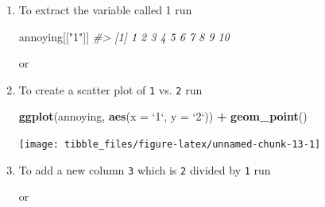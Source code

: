 \documentclass[]{book}
\newenvironment{Shaded}{\begin{snugshade}}{\end{snugshade}}
\newcommand{\CommentTok}[1]{\textcolor[rgb]{0.56,0.35,0.01}{\textit{#1}}}
\newcommand{\DataTypeTok}[1]{\textcolor[rgb]{0.13,0.29,0.53}{#1}}
\newcommand{\KeywordTok}[1]{\textcolor[rgb]{0.13,0.29,0.53}{\textbf{#1}}}
\newcommand{\NormalTok}[1]{#1}
\newcommand{\OperatorTok}[1]{\textcolor[rgb]{0.81,0.36,0.00}{\textbf{#1}}}
\newcommand{\StringTok}[1]{\textcolor[rgb]{0.31,0.60,0.02}{#1}}
\theoremstyle{plain}
\theoremstyle{remark}
\begin{document}
\begin{enumerate}
\def\labelenumi{\arabic{enumi}.}
\item
  To extract the variable called 1 run

\begin{Shaded}
\begin{Highlighting}[]
\NormalTok{annoying[[}\StringTok{"1"}\NormalTok{]]}
\CommentTok{#>  [1]  1  2  3  4  5  6  7  8  9 10}
\end{Highlighting}
\end{Shaded}

  or

\begin{Shaded}
\end{Shaded}
\item
  To create a scatter plot of \texttt{1} vs. \texttt{2} run

\begin{Shaded}
\begin{Highlighting}[]
\KeywordTok{ggplot}\NormalTok{(annoying, }\KeywordTok{aes}\NormalTok{(}\DataTypeTok{x =} \StringTok{`}\DataTypeTok{1}\StringTok{`}\NormalTok{, }\DataTypeTok{y =} \StringTok{`}\DataTypeTok{2}\StringTok{`}\NormalTok{)) }\OperatorTok{+}
\StringTok{  }\KeywordTok{geom_point}\NormalTok{()}
\end{Highlighting}
\end{Shaded}

  \begin{center}\texttt{[image: tibble\_files/figure-latex/unnamed-chunk-13-1]} \end{center}
\item
  To add a new column \texttt{3} which is \texttt{2} divided by \texttt{1} run

\begin{Shaded}
\end{Shaded}

  or


\end{enumerate}
\end{document}
